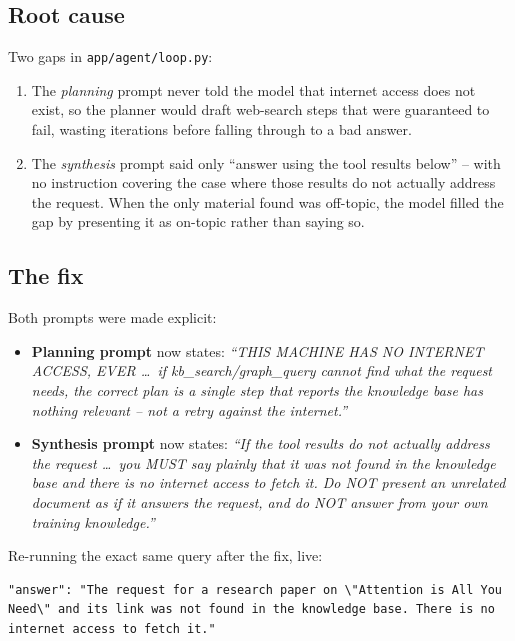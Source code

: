 \documentclass[11pt,a4paper]{article}
\newcommand{\code}[1]{\texttt{\small #1}}
\begin{document}
\subsection{Root cause}

Two gaps in \code{app/agent/loop.py}:

\begin{enumerate}
  \item The \emph{planning} prompt never told the model that internet access
        does not exist, so the planner would draft web-search steps that were
        guaranteed to fail, wasting iterations before falling through to a bad
        answer.
  \item The \emph{synthesis} prompt said only ``answer using the tool results
        below'' -- with no instruction covering the case where those results
        do not actually address the request. When the only material found was
        off-topic, the model filled the gap by presenting it as on-topic
        rather than saying so.
\end{enumerate}

\subsection{The fix}

Both prompts were made explicit:

\begin{itemize}
  \item \textbf{Planning prompt} now states: \emph{``THIS MACHINE HAS NO
        INTERNET ACCESS, EVER \dots\ if kb\_search/graph\_query cannot find
        what the request needs, the correct plan is a single step that
        reports the knowledge base has nothing relevant -- not a retry
        against the internet.''}
  \item \textbf{Synthesis prompt} now states: \emph{``If the tool results do
        not actually address the request \dots\ you MUST say plainly that it
        was not found in the knowledge base and there is no internet access
        to fetch it. Do NOT present an unrelated document as if it answers
        the request, and do NOT answer from your own training knowledge.''}
\end{itemize}

Re-running the exact same query after the fix, live:

\begin{lstlisting}[style=sh]
"answer": "The request for a research paper on \"Attention is All You
Need\" and its link was not found in the knowledge base. There is no
internet access to fetch it."
\end{lstlisting}
\end{document}
